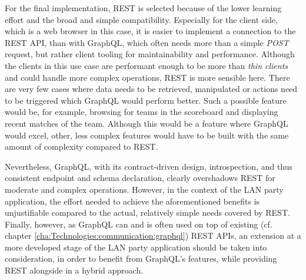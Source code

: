For the final implementation, REST is selected because of the lower learning effort and the broad and simple compatibility.
Especially for the client side, which is a web browser in this case, it is easier to implement a connection to the REST \ac{API}, than with GraphQL, which often needs more than a simple \textit{POST} request, but rather client tooling for maintainability and performance.
Although the clients in this use case are performant enough to be more than \textit{thin clients} and could handle more complex operations, REST is more sensible here.
There are very few cases where data needs to be retrieved, manipulated or actions need to be triggered which GraphQL would perform better.
Such a possible feature would be, for example,  browsing for teams in the scoreboard and displaying recent matches of the team.
Although this would be a feature where GraphQL would excel, other, less complex features would have to be built with the same amount of complexity compared to REST.

Nevertheless, GraphQL, with its contract-driven design, introspection, and thus consistent endpoint and schema declaration, clearly overshadows REST for moderate and complex operations.
However, in the context of the LAN party application, the effort needed to achieve the aforementioned benefits is unjustifiable compared to the actual, relatively simple needs covered by REST.
Finally, however, as GraphQL can and is often used on top of existing (cf. chapter \ref{cha:Technologies:communication:graphql}) REST \acp{API}, an extension at a more developed stage of the LAN party application should be taken into consideration, in order to benefit from GraphQL's features, while providing REST alongside in a hybrid approach.
